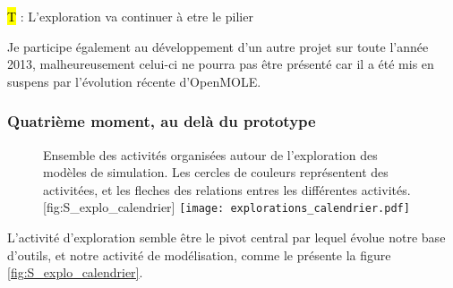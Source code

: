 
\hl{T} : L'exploration va continuer à etre le pilier 

Je participe également au développement d'un autre projet sur toute l'année 2013, malheureusement celui-ci ne pourra pas être présenté car il a été mis en suspens par l'évolution récente d'OpenMOLE.


\subsubsection{Quatrième moment, au delà du prototype}
\label{sssec:quatrieme_moment}

\begin{figure}[htbp]
\begin{sidecaption}[fortoc]{ Ensemble des activités organisées autour de l'exploration des modèles de simulation. Les cercles de couleurs représentent des activitées, et les fleches des relations entres les différentes activités.}[fig:S_explo_calendrier]
  \centering
 \texttt{[image: explorations\_calendrier.pdf]}
  \end{sidecaption}
\end{figure}

L'activité d'exploration semble être le pivot central par lequel évolue notre base d'outils, et notre activité de modélisation, comme le présente la figure \ref{fig:S_explo_calendrier}. 

